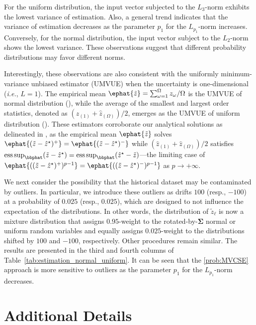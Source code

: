 \documentclass[mnsc, nonblindrev]{informswp}
\newcommand{\1}[1]{\mathds{1}{\left(#1\right)}}
\begin{document}
\begin{appendices}
For the uniform distribution, the input vector subjected to the $L_3$-norm exhibits the lowest variance of estimation. Also, a general trend indicates that the variance of estimation decreases as the parameter $p_1$ for the $L_{p_1}$-norm increases. Conversely, for the normal distribution, the input vector subject to the $L_2$-norm shows the lowest variance. These observations suggest that different probability distributions may favor different norms. 

Interestingly, these observations are also consistent with the uniformly minimum-variance unbiased estimator (UMVUE) when the uncertainty is one-dimensional (\textit{i.e.}, $L = 1$). The empirical mean $\ephat{\tilde{z}} =  \sum_{\omega = 1}^\Omega z_\omega/\Omega$ is the UMVUE of normal distribution (\citealt{rohatgi2015introduction}), while the average of the smallest and largest order statistics, denoted as $(\hat z_{(1)} + \hat{z}_{(\Omega)})/2$, emerges as the UMVUE of uniform distribution (\citealt{bar1985minimum}). 
These estimators corroborate our analytical solutions as delineated in , as the empirical mean $\ephat{\tilde z}$ solves $\ephat{(\tilde{z} -\hat{z}^\star )^+} = \ephat{(\tilde{z} - \hat{z}^\star )^-}$ while $(\hat{z}_{(1)} + \hat{z}_{(\Omega)})/2$ satisfies $\operatorname*{ess\,sup}_{\bbphat}(\tilde{z} - \hat{z}^\star ) = \operatorname*{ess\,sup}_{\bbphat} ( \hat{z}^\star - \tilde{z})$---the limiting case of $\ephat{((\tilde z - \hat z^\star)^{+})^{p-1}} = \ephat{((\tilde z - \hat z^\star)^{-})^{p-1}}$ as $p \to +\infty$.

We next consider the possibility that the historical dataset may be contaminated by outliers. In particular, we introduce these outliers as drifts $100$ (resp., $-100$) at a probability of $0.025$ (resp., $0.025$), which are designed to not influence the expectation of the distributions. In other words, the distribution of $\tilde z_\ell$ is now a mixture distribution that assigns $0.95$-weight to the rotated-by-$\bm \Sigma$ normal or uniform random variables and equally assigns $0.025$-weight to the distributions shifted by $100$ and $-100$, respectively. Other procedures remain similar. The results are presented in the third and fourth columns of Table~\ref{tab:estimation_normal_uniform}. It can be seen that the \ref{prob:MVCSE} approach is more sensitive to outliers as the parameter $p_1$ for the $L_{p_1}$-norm decreases.


\section{Additional Details}
\label{sec:additional_figures}


\end{appendices}
\end{document}
